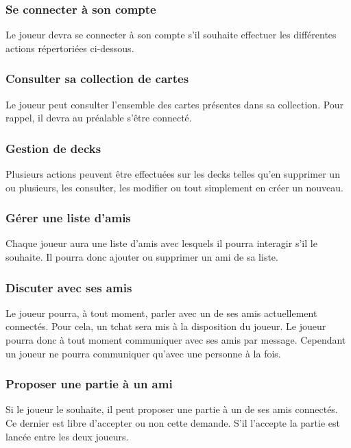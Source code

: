 \documentclass[11pt,a4paper]{article}
\begin{document}
\subsubsection*{Se connecter à son compte}

Le joueur devra se connecter à son compte s'il souhaite effectuer
les différentes actions répertoriées ci-dessous.


\subsubsection*{Consulter sa collection de cartes}

Le joueur peut consulter l'ensemble des cartes présentes dans sa
\gls{collection}. Pour rappel, il devra au préalable s'être connecté.


\subsubsection*{Gestion de decks}

Plusieurs actions peuvent être effectuées sur les decks telles
qu'en supprimer un ou plusieurs, les consulter, les modifier ou tout
simplement en créer un nouveau.


\subsubsection*{Gérer une liste d'amis}

Chaque joueur aura une liste d'amis avec lesquels il pourra
interagir s'il le souhaite. Il pourra donc ajouter ou supprimer un ami de sa liste.


\subsubsection*{Discuter avec ses amis}

Le joueur pourra, à tout moment, parler avec un de ses amis
actuellement connectés. Pour cela, un \gls{tchat} sera mis à la disposition
du joueur.  Le joueur pourra donc à tout moment communiquer avec ses amis par
message. Cependant un joueur ne pourra communiquer qu'avec
une personne à la fois.

\subsubsection*{Proposer une partie à un ami}

Si le joueur le souhaite, il peut proposer une partie à un de ses
amis connectés. Ce dernier est libre d'accepter ou non cette demande.
S'il l'accepte la partie est lancée entre les deux joueurs.
\end{document}
